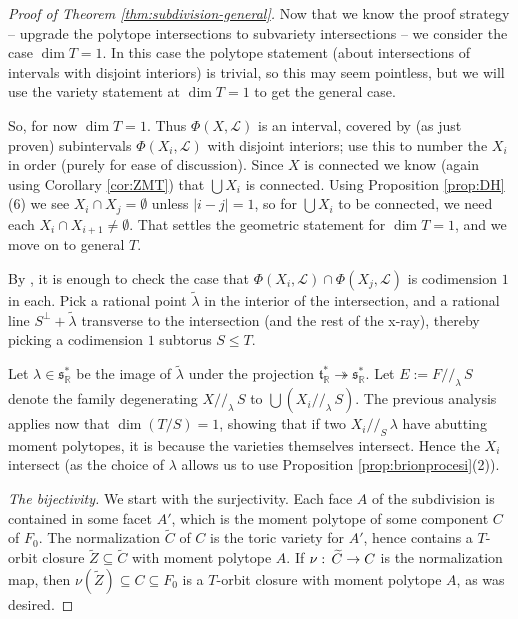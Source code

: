 \documentclass[11pt]{amsart}
\theoremstyle{definition}
\newcommand{\RR}{\mathbb{R}}
\newcommand\Union\bigcup
\newcommand\lie[1]{{\mathfrak #1}}
\newcommand\calL{{\mathcal L}}
\newcommand\onto\twoheadrightarrow
\renewcommand{\colon}{\mathrel{:}}
\renewcommand{\colon}{:\mkern\thinmuskip}
\begin{document}
\begin{proof}[Proof of Theorem \ref{thm:subdivision-general}]
  Now that we know the proof strategy -- upgrade the polytope intersections
  to subvariety intersections -- we consider the case $\dim T = 1$.
  In this case the polytope statement (about intersections of
  intervals with disjoint interiors) is trivial, so this may seem pointless,
  but we will use the variety statement at $\dim T = 1$ to get the
  general case.

  So, for now $\dim T = 1$. Thus $\Phi(X,\calL)$ is an interval, covered by
  (as just proven) subintervals $\Phi(X_i,\calL)$ with disjoint interiors;
  use this to number the $X_i$ in order (purely for ease of discussion). 
  Since $X$ is connected we know (again using Corollary \ref{cor:ZMT}) that
  $\Union X_i$ is connected.
  Using Proposition \ref{prop:DH}(6) we see $X_i \cap X_j = \emptyset$
  unless $|i-j|=1$, so for $\Union X_i$ to be connected, we need each
  $X_i \cap X_{i+1} \neq \emptyset$. That settles the geometric
  statement for $\dim T=1$, and we move on to general $T$.
  
  By \cite{GR-facet-to-facet},
  it is enough to check the case that
  $\Phi(X_i,\calL) \cap \Phi(X_j,\calL)$ is codimension $1$ in each.
  Pick a rational point $\tilde\lambda$ in the interior of the intersection,
  and a rational line $S^\perp + \tilde\lambda$ transverse to the intersection
  (and the rest of the x-ray), thereby picking a codimension $1$ subtorus
  $S\leq T$.

  Let $\lambda \in \lie s_\RR^*$ be the image of $\tilde\lambda$
  under the projection $\lie t_\RR^* \onto \lie s_\RR^*$.
  Let $E := F//_\lambda\, S$ denote the family degenerating $X//_\lambda\, S$
  to $\Union (X_i//_\lambda\, S)$. The previous analysis applies now
  that $\dim(T/S)=1$, showing that if two $X_i//_S\,\lambda$ have
  abutting moment polytopes, it is because the varieties themselves
  intersect. Hence the $X_i$ intersect (as the choice of $\lambda$
  allows us to use Proposition \ref{prop:brionprocesi}(2)).

  {\em The bijectivity.} We start with the surjectivity. Each face $A$ of the
  subdivision is contained in some facet $A'$, which is the moment
  polytope of some component $C$ of $F_0$. The normalization $\widetilde C$
  of $C$ is the toric variety for $A'$, hence contains a $T$-orbit
  closure $\widetilde Z \subseteq \widetilde C$ with moment polytope $A$.
  If $\nu\colon \widetilde C \to C$ is the normalization map,
  then $\nu(\widetilde Z) \subseteq C \subseteq F_0$ is a $T$-orbit closure
  with moment polytope $A$, as was desired.


\end{proof}
\end{document}
